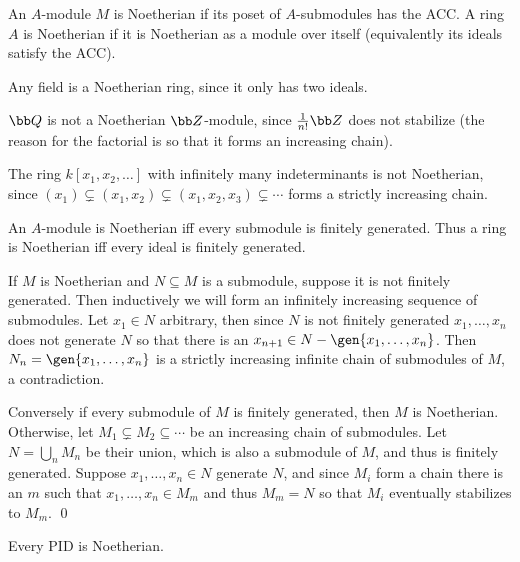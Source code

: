 \eproof

\bdefn

    An $A$-module $M$ is {\emphcolor Noetherian} if its poset of $A$-submodules has the ACC.
    A ring $A$ is {\emphcolor Noetherian} if it is Noetherian as a module over itself (equivalently its ideals satisfy the ACC).

\edefn

\bexam

    Any field is a Noetherian ring, since it only has two ideals.

    $\bQ$ is not a Noetherian $\bZ$-module, since $\frac1{n!}\bZ$ does not stabilize (the reason for the factorial is so that it forms an increasing chain).

    The ring $k[x_1,x_2,\dots]$ with infinitely many indeterminants is not Noetherian, since $(x_1)\subsetneq(x_1,x_2)\subsetneq(x_1,x_2,x_3)\subsetneq\cdots$ forms a strictly increasing chain.

\eexam

\bprop

    An $A$-module is Noetherian iff every submodule is finitely generated.
    Thus a ring is Noetherian iff every ideal is finitely generated.

\eprop

\bproof

    If $M$ is Noetherian and $N\subseteq M$ is a submodule, suppose it is not finitely generated.
    Then inductively we will form an infinitely increasing sequence of submodules.
    Let $x_1\in N$ arbitrary, then since $N$ is not finitely generated $x_1,\dots,x_n$ does not generate $N$ so that there is an $x_{n+1}\in N-\gen{x_1,\dots,x_n}$.
    Then $N_n=\gen{x_1,\dots,x_n}$ is a strictly increasing infinite chain of submodules of $M$, a contradiction.

    Conversely if every submodule of $M$ is finitely generated, then $M$ is Noetherian.
    Otherwise, let $M_1\subsetneq M_2\subseteq\cdots$ be an increasing chain of submodules.
    Let $N=\bigcup_nM_n$ be their union, which is also a submodule of $M$, and thus is finitely generated.
    Suppose $x_1,\dots,x_n\in N$ generate $N$, and since $M_i$ form a chain there is an $m$ such that $x_1,\dots,x_n\in M_m$ and thus $M_m=N$ so that $M_i$ eventually stabilizes to $M_m$.
    \qed

\eproof

\bcoro

    Every PID is Noetherian.

\ecoro

